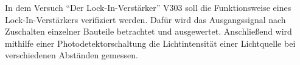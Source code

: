 In dem Versuch \enquote{Der Lock-In-Verstärker} V303 soll die Funktionsweise eines Lock-In-Verstärkers verifiziert werden.
Dafür wird das Ausgangssignal nach Zuschalten einzelner Bauteile betrachtet und ausgewertet. Anschließend wird
mithilfe einer Photodetektorschaltung die Lichtintensität einer Lichtquelle bei verschiedenen Abständen gemessen.
